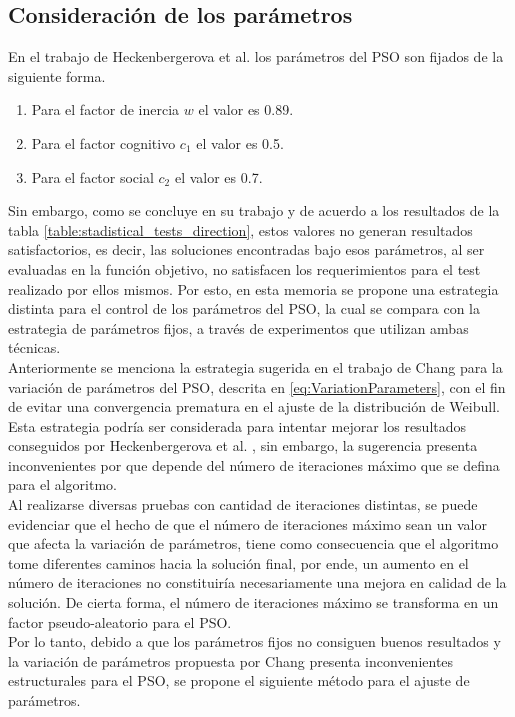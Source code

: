 \subsection{Consideración de los parámetros}\label{subsec:parametros_new}
En el trabajo de Heckenbergerova et al. \cite{Heckenbergerova15} los parámetros del PSO son fijados de la siguiente forma.
\begin{enumerate}
  \item Para el factor de inercia $w$ el valor es 0.89.
  \item Para el factor cognitivo $c_1$ el valor es 0.5.
  \item Para el factor social $c_2$ el valor es 0.7.
\end{enumerate}
Sin embargo, como se concluye en su trabajo y de acuerdo a los resultados de la tabla \ref{table:stadistical_tests_direction}, estos valores no generan resultados satisfactorios, es decir, las soluciones encontradas bajo esos parámetros, al ser evaluadas en la función objetivo, no satisfacen los requerimientos para el test realizado por ellos mismos. Por esto, en esta memoria se propone una estrategia distinta para el control de los parámetros del PSO, la cual se compara con la estrategia de parámetros fijos, a través de experimentos que utilizan ambas técnicas.\\ 
Anteriormente se menciona la estrategia sugerida en el trabajo de Chang \cite{Chang10_2} para la variación de parámetros del PSO, descrita en \ref{eq:VariationParameters}, con el fin de evitar una convergencia prematura en el ajuste de la distribución de Weibull. Esta estrategia podría ser considerada para intentar mejorar los resultados conseguidos por Heckenbergerova et al. \cite{Heckenbergerova15}, sin embargo, la sugerencia presenta inconvenientes por que depende del número de iteraciones máximo que se defina para el algoritmo.\\
Al realizarse diversas pruebas con cantidad de iteraciones distintas, se puede evidenciar que el hecho de que el número de iteraciones máximo sean un valor que afecta la variación de parámetros, tiene como consecuencia que el algoritmo tome diferentes caminos hacia la solución final, por ende, un aumento en el número de iteraciones no constituiría necesariamente una mejora en calidad de la solución. De cierta forma, el número de iteraciones máximo se transforma en un factor pseudo-aleatorio para el PSO.\\
Por lo tanto, debido a que los parámetros fijos no consiguen buenos resultados y la variación de parámetros propuesta por Chang \cite{Chang10_2} presenta inconvenientes estructurales para el PSO, se propone el siguiente método para el ajuste de parámetros.\\

